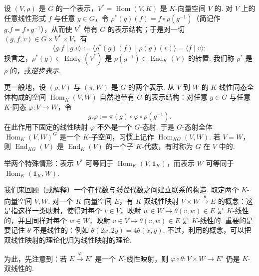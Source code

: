 \begin{numpara}\label{np:fg-4-1-16}
设 $(V,\rho)$ 是 $G$ 的一个表示，$V^*=\operatorname{Hom}(V,K)$ 是 $K$-向量空间 $V$ 的. 对 $V$ 上的任意线性形式 $f$ 与任意 $g\in G$，令 $\rho^*(g)(f)=f\circ\rho(g^{-1})$（简记作 $g.f=f\circ g^{-1}$），从而使 $V^*$ 带有 $G$ 的表示结构；于是对一切 $(g,f,v)\in G\times V^*\times V$，有
\[
\langle g.f\mid g.v\rangle:=\langle\rho^*(g)(f)\mid\rho(g)(v)\rangle=\langle f\mid v\rangle;
\]
换言之，$\rho^*(g)\in\operatorname{End}_K(V^*)$ 是 $\rho(g^{-1})\in\operatorname{End}_K(V)$ 的转置. 我们称 $\rho^*$ 是 $\rho$ 的，或\emph{逆步表示}.
\end{numpara}

\begin{numpara}[内部 Hom]\label{np:fg-4-1-17}
更一般地，设 $(\rho,V)$ 与 $(\pi,W)$ 是 $G$ 的两个表示. 从 $V$ 到 $W$ 的 $K$-线性同态全体构成的空间 $\operatorname{Hom}_K(V,W)$ 自然地带有 $G$ 的表示结构：对任意 $g\in G$ 与任意 $K$-同态 $\varphi:V\longrightarrow W$，令
\[
g.\varphi:=\pi(g)\circ\varphi\circ\rho(g^{-1}).
\]
在此作用下固定的线性映射 $\varphi$ 不外是一个 $G$-态射. 于是 $G$-态射全体 $\operatorname{Hom}_K(V,W)^G$ 是一个 $K$-子空间，习惯上记作 $\operatorname{Hom}_{KG}(V,W)$. 若 $V=W$，则 $\operatorname{End}_{KG}(V)$ 是 $\operatorname{End}_K(V)$ 的一个子 $K$-代数，有时称为 $G$ 在 $V$ 中的.

举两个特殊情形：表示 $V^*$ 可等同于 $\operatorname{Hom}_K(V,\mathbf{1}_K)$，而表示 $W$ 可等同于 $\operatorname{Hom}_K(\mathbf{1}_K,W)$.
\end{numpara}

\begin{numpara}[张量积]\label{np:fg-4-1-18}
我们来回顾（或解释）一个在代数与\emph{线性}代数之间建立联系的构造. 取定两个 $K$-向量空间 $V,W$. 对一个 $K$-向量空间 $E$，有 $K$-双线性映射 $V\times W\xrightarrow{\ \theta\ }E$ 的概念：这是指这样一类映射，使得对每个 $v\in V$，映射 $w\in W\mapsto\theta(v,w)\in E$ 是 $K$-线性的，并且同样对每个 $w\in W$，映射 $v\in V\mapsto\theta(v,w)\in E$ 是 $K$-线性的. 重要的是要记住 $\theta$ 不是线性的：例如 $\theta(2x,2y)=4\theta(x,y)$. 不过，利用的概念，可以把双线性映射的理论化归为线性映射的理论.

为此，先注意到：若 $E\xrightarrow{\ \varphi\ }E'$ 是一个 $K$-线性映射，则 $\varphi\circ\theta:V\times W\longrightarrow E'$ 仍是 $K$-双线性的.
\end{numpara}

